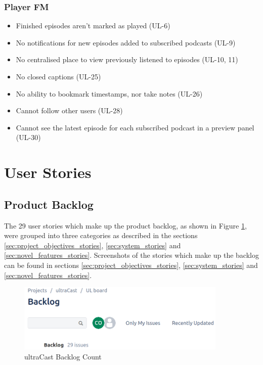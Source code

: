 \documentclass[12pt]{article}
\begin{document}
\subsubsection{Player FM\cite{player_fm}}
\begin{itemize}
    \item Finished episodes aren’t marked as played (UL-6)
    \item No notifications for new episodes added to subscribed podcasts (UL-9)
    \item No centralised place to view previously listened to episodes (UL-10, 11)
    \item No closed captions (UL-25)
    \item No ability to bookmark timestamps, nor take notes (UL-26)
    \item Cannot follow other users (UL-28)
    \item Cannot see the latest episode for each subscribed podcast in a preview panel (UL-30)
\end{itemize}

\fi


\newpage
\section{User Stories}

\subsection{Product Backlog}

The 29 user stories which make up the product backlog, as shown in Figure \ref{fig:backlog}, were grouped into three categories as described in the sections \ref{sec:project_objectives_stories}, \ref{sec:system_stories} and \ref{sec:novel_features_stories}.
Screenshots of the stories which make up the backlog can be found in sections \ref{sec:project_objectives_stories}, \ref{sec:system_stories} and \ref{sec:novel_features_stories}.

\begin{figure}[ht]
    \centering
    \includegraphics[width=10cm]{resources/project_backlog}
    \caption{ultraCast Backlog Count}
    \label{fig:backlog}
\end{figure}
\end{document}
